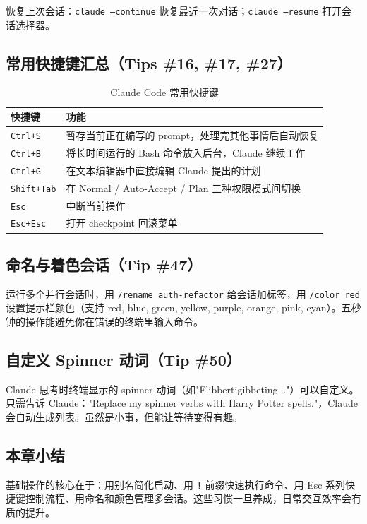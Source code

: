 恢复上次会话：\texttt{claude --continue} 恢复最近一次对话；\texttt{claude --resume} 打开会话选择器。

\subsection{常用快捷键汇总（Tips \#16, \#17, \#27）}

\begin{table}[H]
\centering
\begin{tabular}{lp{9cm}}
\toprule
\textbf{快捷键} & \textbf{功能} \\
\midrule
\texttt{Ctrl+S} & 暂存当前正在编写的 prompt，处理完其他事情后自动恢复 \\
\texttt{Ctrl+B} & 将长时间运行的 Bash 命令放入后台，Claude 继续工作 \\
\texttt{Ctrl+G} & 在文本编辑器中直接编辑 Claude 提出的计划 \\
\texttt{Shift+Tab} & 在 Normal / Auto-Accept / Plan 三种权限模式间切换 \\
\texttt{Esc} & 中断当前操作 \\
\texttt{Esc+Esc} & 打开 checkpoint 回滚菜单 \\
\bottomrule
\end{tabular}
\caption{Claude Code 常用快捷键}
\end{table}

\subsection{命名与着色会话（Tip \#47）}

运行多个并行会话时，用 \texttt{/rename auth-refactor} 给会话加标签，用 \texttt{/color red} 设置提示栏颜色（支持 red, blue, green, yellow, purple, orange, pink, cyan）。五秒钟的操作能避免你在错误的终端里输入命令。

\subsection{自定义 Spinner 动词（Tip \#50）}

Claude 思考时终端显示的 spinner 动词（如"Flibbertigibbeting..."）可以自定义。只需告诉 Claude："Replace my spinner verbs with Harry Potter spells."，Claude 会自动生成列表。虽然是小事，但能让等待变得有趣。

\subsection{本章小结}

基础操作的核心在于：用别名简化启动、用 \texttt{!} 前缀快速执行命令、用 Esc 系列快捷键控制流程、用命名和颜色管理多会话。这些习惯一旦养成，日常交互效率会有质的提升。

